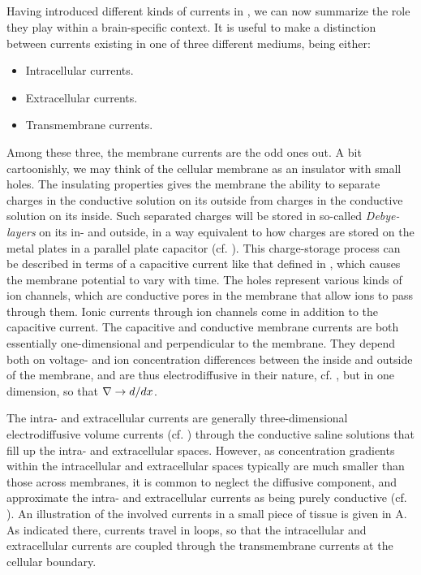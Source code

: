 \subsection{}
\label{sec:Basics:braincurrents}
Having introduced different kinds of currents in , we can now summarize the role they play within a brain-specific context. It is useful to make a distinction between currents existing in one of three different mediums, being either:
\begin{itemize}
\item Intracellular currents. 
\item Extracellular currents. 
\item Transmembrane currents. 
\end{itemize}

Among these three, the membrane currents are the odd ones out. A bit cartoonishly, we may think of the cellular membrane as an insulator with small holes. The insulating properties gives the membrane the ability to separate charges in the conductive solution on its outside from charges in the conductive solution on its inside. Such separated charges will be stored in so-called \textit{Debye-layers} on its in- and outside, in a way equivalent to how charges are stored on the metal plates in a parallel plate capacitor (cf. ). This charge-storage process can be described in terms of a capacitive current like that defined in , which causes the membrane potential to vary with time. The holes represent various kinds of ion channels, which are conductive pores in the membrane that allow ions to pass through them. Ionic currents through ion channels come in addition to the capacitive current. The capacitive and conductive membrane currents are both essentially one-dimensional and perpendicular to the membrane. They depend both on voltage- and ion concentration differences between the inside and outside of the membrane, and are thus electrodiffusive in their nature, cf. , but in one dimension, so that ${\bf \nabla} \rightarrow d/dx$.

The intra- and extracellular currents are generally three-dimensional electrodiffusive volume currents (cf. ) through the conductive saline solutions that fill up the intra- and extracellular spaces. However, as concentration gradients within the intracellular and extracellular spaces typically are much smaller than those across membranes, it is common to neglect the diffusive component, and approximate the intra- and extracellular currents as being purely conductive (cf. ). An illustration of the involved currents in a small piece of tissue is given in A. As indicated there, currents travel in loops, so that the intracellular and extracellular currents are coupled through the transmembrane currents at the cellular boundary. 

